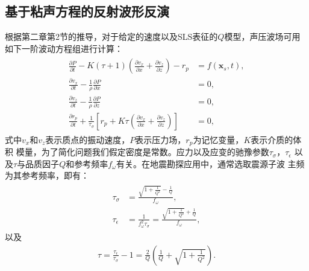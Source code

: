 \subsection{基于粘声方程的反射波形反演}
\vspace{-1.0cm}
根据第二章第2节的推导，对于给定的速度以及SLS表征的$Q$模型，声压波场可用如下一阶波动方程组进行计算：
     \begin{eqnarray}
        \begin{aligned}
        \frac{\partial P}{\partial t} -
        K(\tau+1)(\frac{\partial v_x}{\partial x}
        +\frac{\partial v_z}{\partial z})-r_p &=f(\mathbf{x}_s,t),
        \\
        \frac{\partial v_x}{\partial t} - \frac{1}{\rho}\frac{\partial P}{\partial x}
        &=0,\\
        \frac{\partial v_z}{\partial t} - \frac{1}{\rho}\frac{\partial P}{\partial z}&=0,\\
        \frac{\partial{r_p}}{\partial t} +
        \frac{1}{\tau_\sigma}\left[r_p+K\tau(\frac{\partial
        v_x}{\partial x}+\frac{\partial v_z}{\partial z})\right]&=0,
        \end{aligned}
        \label{eq:viscoacoustic}
    \end{eqnarray}
式中$v_x$和$v_z$表示质点的振动速度，$P$表示压力场，$r_p$为记忆变量，$K$表示介质的体积
模量，为了简化问题我们假定密度是常数。应力以及应变的驰豫参数$\tau_\sigma$，$\tau_\epsilon$
以及$\tau$与品质因子$Q$和参考频率$f_\omega$有关。在地震勘探应用中，通常选取震源子波
主频为其参考频率，即有：
    \begin{eqnarray}
        \begin{aligned}
            \tau_\sigma &= \frac{\sqrt{1+\frac{1}{Q^2}}-\frac{1}{Q}}{f_\omega},\\
            \tau_\epsilon &= \frac{1}{f^2_\omega\tau_\sigma}=\frac{\sqrt{1+\frac{1}{Q^2}}+\frac{1}{Q}}{f_\omega},
        \end{aligned}
    \end{eqnarray}
以及
    \begin{eqnarray}
        \tau=\frac{\tau_\epsilon}{\tau_\sigma}-1=\frac{2}{Q}(\frac{1}{Q}+\sqrt{1+\frac{1}{Q^2}}).
        \label{eq:tq}
    \end{eqnarray}


